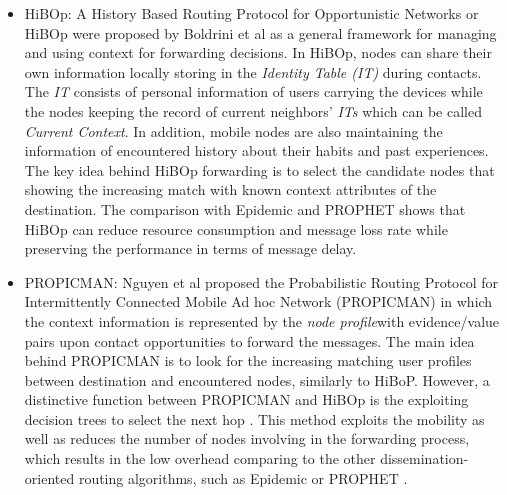 	\begin{itemize}
		\item HiBOp:
		A History Based Routing Protocol for Opportunistic Networks or HiBOp were proposed by Boldrini et al \cite{Boldrini2007} as a general framework for managing and using context for forwarding decisions.
		In HiBOp, nodes can share their own information locally storing in the \emph{Identity Table (IT)} during contacts.
		The \textit{IT} consists of personal information of users carrying the devices while the nodes keeping the record of current neighbors' \textit{ITs} which can be called \emph{Current Context}.
		In addition, mobile nodes are also maintaining the information of encountered history about their habits and past experiences.
		The key idea behind HiBOp forwarding is to select the candidate nodes that showing the increasing match with known context attributes of the destination.
		The comparison with Epidemic and PROPHET shows that HiBOp can reduce resource consumption and message loss rate while preserving the performance in terms of message delay.

		\item PROPICMAN:
		Nguyen et al \cite{Nguyen2007} proposed the Probabilistic Routing Protocol for Intermittently Connected Mobile Ad hoc Network (PROPICMAN) in which the context information is represented by the \emph{node profile}with evidence/value pairs upon contact opportunities to forward the messages. 
		The main idea behind PROPICMAN is to look for the increasing matching user profiles between destination and encountered nodes, similarly to HiBoP.
		However, a distinctive function between PROPICMAN and HiBOp is the exploiting decision trees to select the next hop \cite{Conti2010}.
		This method exploits the mobility as well as reduces the number of nodes involving in the forwarding process, which results in the low overhead comparing to the other dissemination-oriented routing algorithms, such as Epidemic or PROPHET \cite{isaac2013}. 


\end{itemize}
